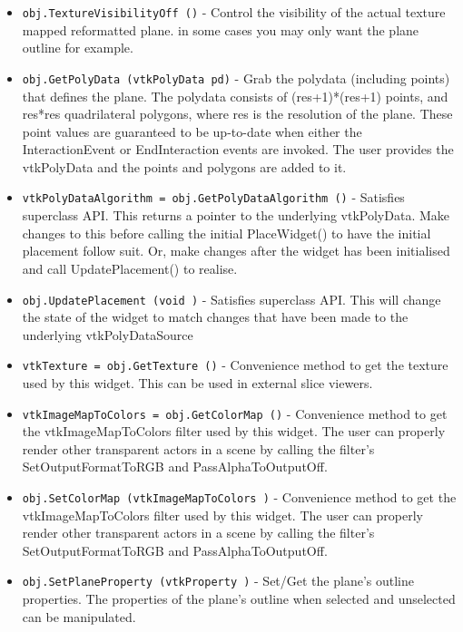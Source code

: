 \begin{itemize}
\item  \verb|obj.TextureVisibilityOff ()| -  Control the visibility of the actual texture mapped reformatted plane.
 in some cases you may only want the plane outline for example.

\item  \verb|obj.GetPolyData (vtkPolyData pd)| -  Grab the polydata (including points) that defines the plane.  The
 polydata consists of (res+1)*(res+1) points, and res*res quadrilateral
 polygons, where res is the resolution of the plane. These point values
 are guaranteed to be up-to-date when either the InteractionEvent or
 EndInteraction events are invoked. The user provides the vtkPolyData and
 the points and polygons are added to it.

\item  \verb|vtkPolyDataAlgorithm = obj.GetPolyDataAlgorithm ()| -  Satisfies superclass API.  This returns a pointer to the underlying
 vtkPolyData.  Make changes to this before calling the initial PlaceWidget()
 to have the initial placement follow suit.  Or, make changes after the
 widget has been initialised and call UpdatePlacement() to realise.

\item  \verb|obj.UpdatePlacement (void )| -  Satisfies superclass API.  This will change the state of the widget to
 match changes that have been made to the underlying vtkPolyDataSource

\item  \verb|vtkTexture = obj.GetTexture ()| -  Convenience method to get the texture used by this widget.  This can be
 used in external slice viewers.

\item  \verb|vtkImageMapToColors = obj.GetColorMap ()| -  Convenience method to get the vtkImageMapToColors filter used by this
 widget.  The user can properly render other transparent actors in a
 scene by calling the filter's SetOutputFormatToRGB and 
 PassAlphaToOutputOff.

\item  \verb|obj.SetColorMap (vtkImageMapToColors )| -  Convenience method to get the vtkImageMapToColors filter used by this
 widget.  The user can properly render other transparent actors in a
 scene by calling the filter's SetOutputFormatToRGB and 
 PassAlphaToOutputOff.

\item  \verb|obj.SetPlaneProperty (vtkProperty )| -  Set/Get the plane's outline properties. The properties of the plane's 
 outline when selected and unselected can be manipulated.


\end{itemize}
